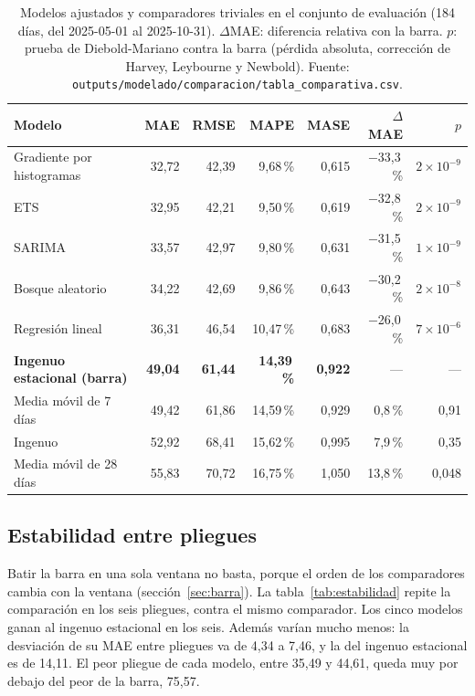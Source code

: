 \begin{table}[H]
\centering
\caption{Modelos ajustados y comparadores triviales en el conjunto de evaluación (184 días, del 2025-05-01 al 2025-10-31). $\Delta$MAE: diferencia relativa con la barra. $p$: prueba de Diebold-Mariano contra la barra (pérdida absoluta, corrección de Harvey, Leybourne y Newbold). Fuente: \texttt{outputs/\allowbreak{}modelado/\allowbreak{}comparacion/\allowbreak{}tabla\_\allowbreak{}comparativa.csv}.}\label{tab:resultados}
\small
\begin{tabular}{@{}lrrrrrr@{}}
\toprule
\textbf{Modelo} & \textbf{MAE} & \textbf{RMSE} & \textbf{MAPE} & \textbf{MASE} & \textbf{$\Delta$MAE} & \textbf{$p$} \\
\midrule
Gradiente por histogramas & 32,72 & 42,39 & 9,68\,\% & 0,615 & $-$33,3\,\% & $2\times10^{-9}$ \\
ETS & 32,95 & 42,21 & 9,50\,\% & 0,619 & $-$32,8\,\% & $2\times10^{-9}$ \\
SARIMA & 33,57 & 42,97 & 9,80\,\% & 0,631 & $-$31,5\,\% & $1\times10^{-9}$ \\
Bosque aleatorio & 34,22 & 42,69 & 9,86\,\% & 0,643 & $-$30,2\,\% & $2\times10^{-8}$ \\
Regresión lineal & 36,31 & 46,54 & 10,47\,\% & 0,683 & $-$26,0\,\% & $7\times10^{-6}$ \\
\midrule
\textbf{Ingenuo estacional (barra)} & \textbf{49,04} & \textbf{61,44} & \textbf{14,39\,\%} & \textbf{0,922} & --- & --- \\
Media móvil de 7 días & 49,42 & 61,86 & 14,59\,\% & 0,929 & 0,8\,\% & 0,91 \\
Ingenuo & 52,92 & 68,41 & 15,62\,\% & 0,995 & 7,9\,\% & 0,35 \\
Media móvil de 28 días & 55,83 & 70,72 & 16,75\,\% & 1,050 & 13,8\,\% & 0,048 \\
\bottomrule
\end{tabular}
\end{table}

\subsection{Estabilidad entre pliegues}\label{sec:res-estabilidad}

Batir la barra en una sola ventana no basta, porque el orden de los comparadores cambia con la ventana (sección~\ref{sec:barra}). La tabla~\ref{tab:estabilidad} repite la comparación en los seis pliegues, contra el mismo comparador. Los cinco modelos ganan al ingenuo estacional en los seis. Además varían mucho menos: la desviación de su MAE entre pliegues va de 4,34 a 7,46, y la del ingenuo estacional es de 14,11. El peor pliegue de cada modelo, entre 35,49 y 44,61, queda muy por debajo del peor de la barra, 75,57.

